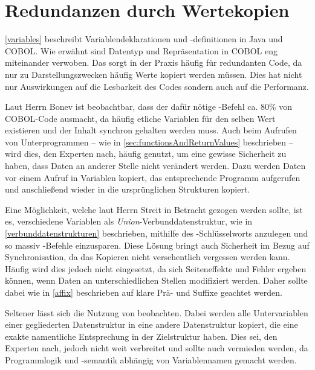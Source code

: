 \section{Redundanzen durch Wertekopien}
\autoref{variables} beschreibt Variablendeklarationen und -definitionen in Java und COBOL. Wie erwähnt sind Datentyp und Repräsentation in COBOL eng miteinander verwoben. Das sorgt in der Praxis häufig für redundanten Code, da nur zu Darstellungszwecken häufig Werte kopiert werden müssen. Dies hat nicht nur Auswirkungen auf die Lesbarkeit des Codes sondern auch auf die Performanz.

Laut Herrn Bonev ist beobachtbar, dass der dafür nötige -Befehl ca. 80\% von COBOL-Code ausmacht, da häufig etliche Variablen für den selben Wert existieren und der Inhalt synchron gehalten werden muss. Auch beim Aufrufen von Unterprogrammen -- wie in \autoref{sec:functionsAndReturnValues} beschrieben -- wird dies, den Experten nach, häufig genutzt, um eine gewisse Sicherheit zu haben, dass Daten an anderer Stelle nicht verändert werden. Dazu werden Daten vor einem Aufruf in Variablen kopiert, das entsprechende Programm aufgerufen und anschließend wieder in die ursprünglichen Strukturen kopiert. 

Eine Möglichkeit, welche laut Herrn Streit in Betracht gezogen werden sollte, ist es, verschiedene Variablen als \textit{Union}-Verbunddatenstruktur, wie in \autoref{verbunddatenstrukturen} beschrieben, mithilfe des -Schlüsselworts anzulegen und so massiv -Befehle einzusparen. Diese Lösung bringt auch Sicherheit im Bezug auf Synchronisation, da das Kopieren nicht versehentlich vergessen werden kann. Häufig wird dies jedoch nicht eingesetzt, da sich Seiteneffekte und Fehler ergeben können, wenn Daten an unterschiedlichen Stellen modifiziert werden. Daher sollte dabei wie in \autoref{affix} beschrieben auf klare Prä- und Suffixe geachtet werden.

Seltener lässt sich die Nutzung von  beobachten. Dabei werden alle Untervariablen einer gegliederten Datenstruktur in eine andere Datenstruktur kopiert, die eine exakte namentliche Entsprechung in der Zielstruktur haben. Dies sei, den Experten nach, jedoch nicht weit verbreitet und sollte auch vermieden werden, da Programmlogik und -semantik abhängig von Variablennamen gemacht werden.
